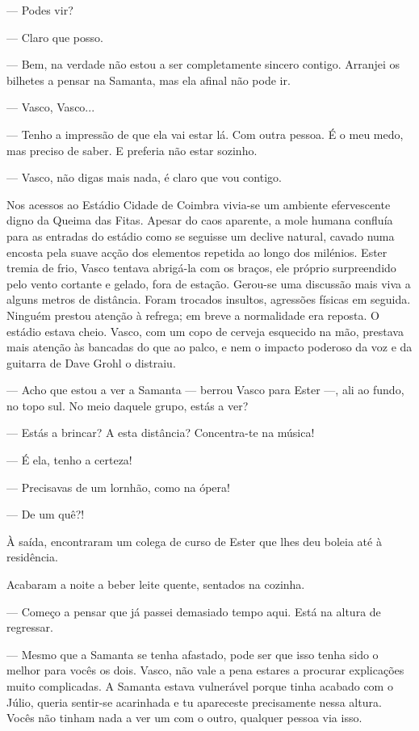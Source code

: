 --- Podes vir?

--- Claro que posso.

--- Bem, na verdade não estou a ser completamente sincero contigo.
  Arranjei os bilhetes a pensar na Samanta, mas ela afinal não pode ir.

--- Vasco, Vasco...

--- Tenho a impressão de que ela vai estar lá. Com outra pessoa. É o meu
  medo, mas preciso de saber. E preferia não estar sozinho.

--- Vasco, não digas mais nada, é claro que vou contigo.

Nos acessos ao
  Estádio Cidade de Coimbra vivia-se um ambiente efervescente digno da Queima das Fitas. Apesar do caos
aparente, a mole humana confluía para as entradas do estádio como se
seguisse um declive natural, cavado numa encosta pela suave acção dos
elementos repetida ao longo dos milénios. Ester tremia de frio, Vasco
tentava abrigá-la com os braços, ele próprio surpreendido pelo vento
cortante e gelado, fora de estação. Gerou-se uma discussão mais viva a
alguns metros de distância. Foram trocados insultos, agressões físicas
em seguida. Ninguém prestou atenção à refrega; em breve a normalidade
era reposta. O estádio estava cheio. Vasco, com um copo de cerveja
esquecido na mão, prestava mais atenção às bancadas do que ao palco, e
nem o impacto poderoso da voz e da guitarra de Dave Grohl o distraiu.

--- Acho que estou a ver a Samanta --- berrou Vasco para Ester ---, ali ao
  fundo, no topo sul. No meio daquele grupo, estás a ver?

--- Estás a brincar? A esta distância? Concentra-te na música!

--- É ela, tenho a certeza!

--- Precisavas de um lornhão, como na ópera!

--- De um quê?!


À saída, encontraram um colega de curso de Ester que lhes deu boleia até
à residência.

Acabaram a noite a beber leite quente, sentados na cozinha.

--- Começo a pensar que já passei demasiado tempo aqui.
Está na altura de regressar.

--- Mesmo que a Samanta se tenha afastado, pode ser que isso tenha sido o
  melhor para vocês os dois. Vasco, não vale a pena estares a procurar
  explicações muito complicadas. A Samanta estava vulnerável porque
  tinha acabado com o Júlio, queria sentir-se acarinhada e tu apareceste
  precisamente nessa
altura. Vocês não tinham nada a ver um com o outro, qualquer pessoa via
isso.

